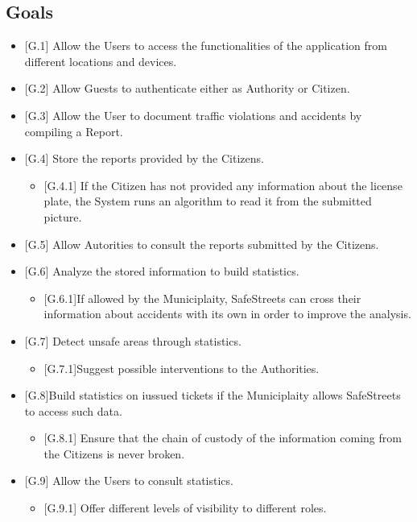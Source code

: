 \documentclass{report}
\begin{document}
\subsection{Goals}
\begin{itemize}
    \item {[G.1]} Allow the Users to access the functionalities of the application from different locations and devices.
	\item {[G.2]} Allow Guests to authenticate either as Authority or Citizen.
    \item {[G.3]} Allow the User to document traffic violations and accidents by compiling a Report.
    \item {[G.4]} Store the reports provided by the Citizens.
    \begin{itemize}
    		\item {[G.4.1]} If the Citizen has not provided any information about the license plate, the System runs an algorithm to read it from the submitted picture.
		\end{itemize}     
	\item {[G.5]} Allow Autorities to consult the reports submitted by the Citizens.
    \item {[G.6]} Analyze the stored information to build statistics.
    \begin{itemize}
    		\item {[G.6.1]}If allowed by the Municiplaity, SafeStreets can cross their information about accidents with its own in order to improve the analysis.
	\end{itemize}  
	\item {[G.7]} Detect unsafe areas through statistics.
	\begin{itemize}
		\item {[G.7.1]}Suggest possible interventions to the Authorities.
	\end{itemize}
	\item{[G.8]}Build statistics on iussued tickets if the Municiplaity allows SafeStreets to access such data.
    \begin{itemize}
        \item {[G.8.1]} Ensure that the chain of custody of the information coming from the Citizens is never broken.
	\end{itemize}
	\item {[G.9]} Allow the Users to consult statistics.
	\begin{itemize}
		\item {[G.9.1]} Offer different levels of visibility to different roles.
	\end{itemize}
\end{itemize}
\end{document}
